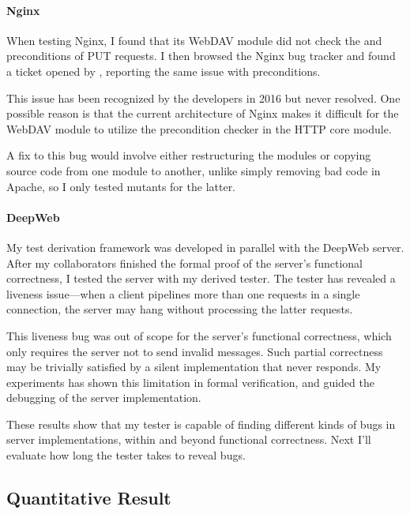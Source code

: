 \paragraph{Nginx}
When testing Nginx, I found that its WebDAV module did not check the
 and  preconditions of PUT requests.  I
then browsed the Nginx bug tracker and found a ticket opened by
\citet{nginx242}, reporting the same issue with 
preconditions.

This issue has been recognized by the developers in 2016 but never resolved.
One possible reason is that the current architecture of Nginx makes it difficult
for the WebDAV module to utilize the precondition checker in the HTTP core
module.

A fix to this bug would involve either restructuring the modules or copying
source code from one module to another, unlike simply removing bad code in
Apache, so I only tested mutants for the latter.

\paragraph{DeepWeb}
My test derivation framework was developed in parallel with the DeepWeb server.
After my collaborators finished the formal proof of the server's functional
correctness, I tested the server with my derived tester.  The tester has
revealed a liveness issue---when a client pipelines more than one requests in a
single connection, the server may hang without processing the latter requests.

This liveness bug was out of scope for the server's functional correctness,
which only requires the server not to send invalid messages.  Such partial
correctness may be trivially satisfied by a silent implementation that never
responds.  My experiments has shown this limitation in formal verification, and
guided the debugging of the server implementation.

These results show that my tester is capable of finding different kinds of bugs
in server implementations, within and beyond functional correctness.  Next I'll
evaluate how long the tester takes to reveal bugs.


\subsection{Quantitative Result}
\label{sec:http-quant}

